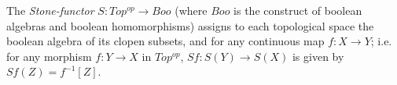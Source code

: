 \documentclass[12pt]{article}
\begin{document}
The \emph{Stone-functor} $S: Top^{op} \rightarrow Boo$ (where $Boo$ is the construct of boolean algebras and boolean homomorphisms) assigns to each topological space the boolean algebra of its clopen subsets, and for any continuous map $f: X \rightarrow Y$; i.e. for any morphism $f: Y \rightarrow X$ in $Top^{op}$, $Sf: S(Y) \rightarrow S(X)$ is given by $Sf(Z) = f^{-1}[Z]$.
\end{document}
